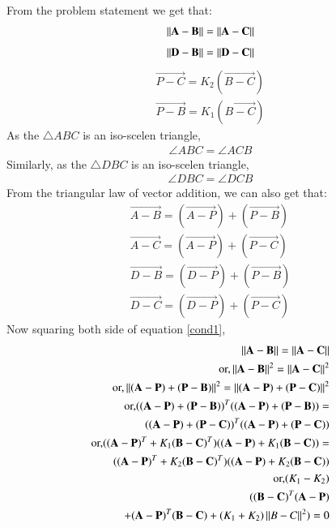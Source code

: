 \documentclass[journal,12pt,twocolumn]{IEEEtran}
\begin{document}
From the problem statement we get that:
\begin{equation}
\begin{aligned}
\left\lVert\mathbf{A}-\mathbf{B}\right\rVert = \left\lVert\mathbf{A}-\mathbf{C}\right\rVert
\end{aligned}
\end{equation}
\label{cond1}
\begin{align}
\left\lVert\mathbf{D}-\mathbf{B}\right\rVert = \left\lVert\mathbf{D}-\mathbf{C}\right\rVert
\end{align}
\label{cond2}
\begin{align}
\vec{P-C} = K_2 (\vec{B-C})\\
\vec{P-B} = K_1 (\vec{B-C})
\end{align}
As the $\triangle ABC$ is an iso-scelen triangle,
\begin{align}
\angle ABC = \angle ACB
\end{align}
Similarly, as the $\triangle DBC$ is an iso-scelen triangle,
\begin{align}
\angle DBC = \angle DCB
\end{align}
From the triangular law of vector addition, we can also get that:
\begin{align}
\vec{A-B} = (\vec{A-P}) + (\vec{P-B})\\
\vec{A-C} = (\vec{A-P}) + (\vec{P-C})\\
\vec{D-B} = (\vec{D-P}) + (\vec{P-B})\\
\vec{D-C} = (\vec{D-P}) + (\vec{P-C})
\end{align}
Now squaring both side of equation \ref{cond1}, 
\begin{align}
\left\lVert\mathbf{A}-\mathbf{B}\right\rVert =\left\lVert\mathbf{A}-\mathbf{C}\right\rVert\\
\text{or,}\left\lVert\mathbf{A}-\mathbf{B}\right\rVert^2 = \left\lVert\mathbf{A}-\mathbf{C}\right\rVert^2\\
\text{or,}\left\lVert(\mathbf{A-P}) + (\mathbf{P-B})\right\rVert^2 = \left\lVert(\mathbf{A-P}) + (\mathbf{P-C})\right\rVert^2\\
\text{or,}((\mathbf{A-P}) + (\mathbf{P-B}))^T ((\mathbf{A-P}) + (\mathbf{P-B})) =\\
 ((\mathbf{A-P}) + (\mathbf{P-C}))^T ((\mathbf{A-P}) + (\mathbf{P-C}))\\
\text{or,}((\mathbf{A-P})^T + K_1(\mathbf{B-C})^T)((\mathbf{A-P}) + K_1(\mathbf{B-C})) =\\
((\mathbf{A-P})^T + K_2(\mathbf{B-C})^T)((\mathbf{A-P}) + K_2(\mathbf{B-C}))\\
\text{or,} (K_1 - K_2)\\
((\mathbf{B-C})^T (\mathbf{A-P}) \\
+ (\mathbf{A-P})^T (\mathbf{B-C}) + (K_1 + K_2)\left\lVert B-C\right\rVert^2)=0
\end{align}
\end{document}
